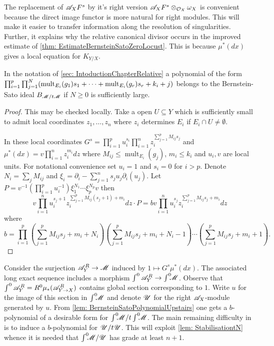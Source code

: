 The replacement of $\mathscr{A}_XF^s$ by it's right version $\mathscr{A}_XF^s \otimes_{\mathcal{O}_X}\omega_X$ is convenient because the direct image functor is more natural for right modules.
This will make it easier to transfer information along the resolution of singularities.
Further, it explains why the relative canonical divisor occurs in the improved estimate of \cref{thm: EstimateBernsteinSatoZeroLocust}.
This is because $\mu^*(dx)$ gives a local equation for $K_{Y/X}$.
\begin{lemma}\label{lem: BernsteinSatoPolynomialUpstairs}
  In the notation of \cref{sec: IntoductionChapterRelative} a polynomial of the form
  $\prod_{i=1}^p \prod_{j=1}^N(\operatorname{mult}_{E_i}(g_1)\allowbreak s_1 + \cdots + \operatorname{mult}_{E_i}(g_r)\allowbreak s_r + k_i + j)$
  belongs to the Bernstein-Sato ideal $B_{\mathscr{M}/t\mathscr{M}}$ if $N\geq 0$ is sufficiently large.
\end{lemma}
\begin{proof}
  This may be checked locally.
  Take a open $U\subseteq Y$ which is sufficiently small to admit local coordinates $z_1,\ldots,z_n$ where $z_i$ determines $E_i$ if $E_i\cap U \neq \emptyset$.

  In these local coordinates $G^s = \prod_{i=1}^p u_i^{s_i} \prod_{i=1}^nz_i^{\sum_{j=1}^p M_{ij}s_j}$ and $\mu^*(dx) = v \prod_{i=1}^n z_i^{m_i} dz$ where $M_{ij} \leq \operatorname{mult}_{E_i}(g_j)$, $m_i \leq k_i$ and $u_i,v$ are local units.
  For notational convenience set $u_i=1$ and $s_i=0$ for $i>p$.
  Denote $N_i = \sum_j M_{ij}$ and $\xi_i = \partial_i - \sum_{j=1}^n s_ju_j \partial_i(u_j)$.
  Let $P = v^{-1}(\prod_{i=1}^p u_i^{-1})\xi_1^{N_1} \cdots \xi_p^{N_p} v$ then
  $$v\prod_{i=1}^n u_i^{s_j + 1}z_i^{\sum_{j=1}^p M_{ij}(s_j+1) + m_i}dz \cdot P =  b v \prod_{i=1}^nu_i^{s_j}z_i^{\sum_{j=1}^p M_{ij}s_j + m_i}dz $$
  where
  $$b = \prod_{i=1}^p(\sum_{j=1}^p M_{ij}s_j + m_i + N_i)(\sum_{j=1}^p M_{ij}s_j + m_i + N_i - 1)\cdots(\sum_{j=1}^p M_{ij}s_j + m_i +1 ).$$
\end{proof}
Consider the surjection $\mathscr{A}_Y^R\to \mathscr{M}$ induced by $1\mapsto G^s \mu^*(dx)$.
The associated long exact sequence includes a morphism $\int^0 \mathscr{A}_Y^R \to \int^0 \mkern -8mu\mathscr{M}$.
Observe that $\int^0 \mathscr{A}_Y^R = R^0\mu_*(\mathscr{A}_{Y\to X}^R)$ contains global section corresponding to $1$.
Write $u$ for the image of this section in $\int^0 \mkern -8mu \mathscr{M}$ and denote $\mathscr{U}$ for the right $\mathscr{A}_X$-module generated by $u$.
From \cref{lem: BernsteinSatoPolynomialUpstairs} one gets a $b$-polynomial of a desirable form for $\int^0 \mkern -8mu \mathscr{M}/t\int^0 \mkern -8mu\mathscr{M}$.
The main remaining difficulty in is to induce a $b$-polynomial for $\mathscr{U}/t\mathscr{U}$.
This will exploit \cref{lem: StabilisationtN} whence it is needed that $\int^0 \mkern -8mu\mathscr{M} /\mathscr{U}$ has grade at least $n+1$.

